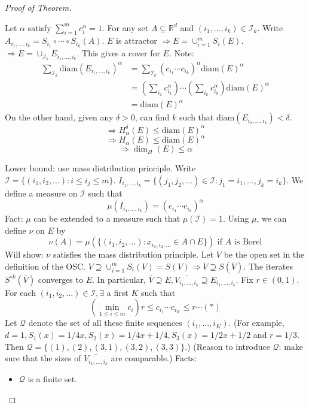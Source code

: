 \documentclass{article}
\theoremstyle{definition}
\newenvironment{proofs}[1][\proofname]{%
  \begin{proof}[#1]$ $\par\nobreak\ignorespaces
}{%
  \end{proof}
}
\newcommand{\I}{\mathcal I}
\newcommand{\Q}{\mathcal Q}
\newcommand{\RR}{\mathbb R}
\newcommand{\Ra}{\Rightarrow}
\newcommand{\diam}{\text{diam}}
\begin{document}
\begin{proofs}[Proof of Theorem]
	Let $\alpha$ satisfy $\sum_{i = 1}^m c_i^\alpha = 1$.
	For any set $A \subseteq \RR^d$ and $(i_1, ..., i_k) \in \I_k$.
	Write $A_{i_1, ..., i_k} = S_{i_1} \circ \cdots \circ S_{i_k}(A)$.
	$E$ is attractor $\Ra E = \cup_{i = 1}^m S_i(E)$.
	$\Ra E = \cup_{\I_k} E_{i_1, ..., i_k}$.
	This gives a cover for $E$.
	Note:
	\[
		\begin{split}
			\sum_{\I_k} \diam (E_{i_1, ..., i_k})^\alpha &= \sum_{\I_k} (c_{i_1} \cdots c_{i_k})^\alpha \diam(E)^\alpha\\
			&= \left( \sum_{i_1} c_{i_1}^\alpha \right) \cdots \left( \sum_{i_k} c_{i_k}^\alpha \right) \diam(E)^\alpha\\ 
			&= \diam(E)^\alpha
		\end{split}
	\]
	On the other hand, given any $\delta > 0$, can find $k$ such that $\diam(E_{i_1, ..., i_k}) < \delta$.
	\[
		\Ra H_\alpha^\delta(E) \leq \diam(E)^\alpha
	\]
	\[
		\Ra H_\alpha(E) \leq \diam(E)^\alpha
	\]
	\[
		\Ra \dim_H(E) \leq \alpha
	\]

	\par Lower bound: use mass distribution principle.
	Write $\I = \{(i_1, i_2, ...): i \leq i_j \leq m\}$.
	$I_{i_1, ..., i_k} = \{(j_1, j_2, ...) \in \I: j_1 = i_1, ..., j_k = i_k\}$.
	We define a measure on $\I$ such that
	\[
		\mu(I_{i_1, ..., i_k}) = (c_{i_1} \cdots c_{i_k})^\alpha
	\]
	Fact: $\mu$ can be extended to a measure such that $\mu(\I) = 1$.
	Using $\mu$, we can define $\nu$ on $E$ by
	\[
		\nu(A) = \mu(\{(i_1, i_2, ...): x_{i_1, i_2, ...} \in A \cap E\}) \text{ if } A \text{ is Borel}
	\]
	Will show: $\nu$ satisfies the mass distribution principle.
	Let $V$ be the open set in the definition of the OSC.
	$V \supseteq \cup_{i = 1}^m S_i(V) = S(V) \Ra \overline{V} \supseteq S(\overline{V})$.
	The iterates $S^{\circ k}(\overline{V})$ converges to $E$.
	In particular, $\overline{V} \supseteq E, \overline{V_{i_1, ..., i_k}} \supseteq E_{i_1, ..., i_k}$.
	Fix $r \in (0, 1)$.
	For each $(i_1, i_2, ...) \in \I, \exists$ a first $K$ such that
	\[
		\left( \min_{1 \leq i \leq m} c_i \right) r \leq c_{i_1} \cdots c_{i_K} \leq r \cdots (*)
	\]
	Let $\Q$ denote the set of all these finite sequences $(i_1, ..., i_K)$.
	(For example, $d = 1, S_1(x) = 1/4 x, S_2(x) = 1/4 x + 1/4, S_3(x) = 1/2 x + 1/2$ and $r = 1/3$.
	Then $\Q = \{(1), (2), (3, 1), (3, 2), (3, 3)\}$.)
	(Reason to introduce $\Q$: make sure that the sizes of $\overline{V_{i_1, ..., i_k}}$ are comparable.)
	Facts:
	\begin{itemize}
		\item $\Q$ is a finite set.


\end{itemize}
\end{proofs}
\end{document}
